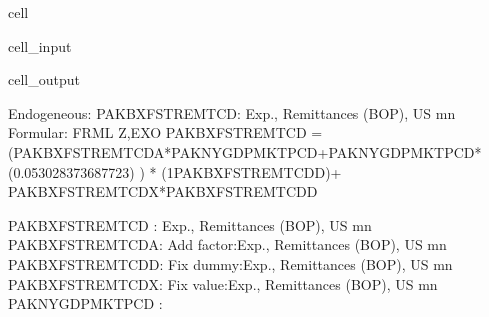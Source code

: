 \documentclass[letterpaper,10pt,english]{jupyterBook}
\begin{document}
\begin{sphinxuseclass}{cell}\begin{sphinxVerbatimInput}

\begin{sphinxuseclass}{cell_input}
\begin{sphinxVerbatim}[commandchars=\\\{\}]
\end{sphinxVerbatim}

\end{sphinxuseclass}\end{sphinxVerbatimInput}
\begin{sphinxVerbatimOutput}

\begin{sphinxuseclass}{cell_output}
\begin{sphinxVerbatim}[commandchars=\\\{\}]
Endogeneous: PAKBXFSTREMTCD: Exp., Remittances (BOP), US\PYGZdl{} mn
Formular: FRML \PYGZlt{}Z,EXO\PYGZgt{} PAKBXFSTREMTCD = (PAKBXFSTREMTCD\PYGZus{}A*PAKNYGDPMKTPCD+PAKNYGDPMKTPCD* (0.053028373687723) ) * (1\PYGZhy{}PAKBXFSTREMTCD\PYGZus{}D)+ PAKBXFSTREMTCD\PYGZus{}X*PAKBXFSTREMTCD\PYGZus{}D  \PYGZdl{}

PAKBXFSTREMTCD  : Exp., Remittances (BOP), US\PYGZdl{} mn
PAKBXFSTREMTCD\PYGZus{}A: Add factor:Exp., Remittances (BOP), US\PYGZdl{} mn
PAKBXFSTREMTCD\PYGZus{}D: Fix dummy:Exp., Remittances (BOP), US\PYGZdl{} mn
PAKBXFSTREMTCD\PYGZus{}X: Fix value:Exp., Remittances (BOP), US\PYGZdl{} mn
PAKNYGDPMKTPCD  : 
\end{sphinxVerbatim}

\end{sphinxuseclass}\end{sphinxVerbatimOutput}

\end{sphinxuseclass}
\end{document}

